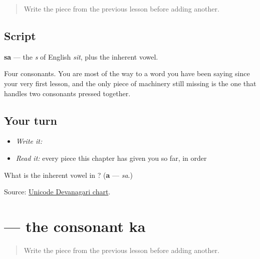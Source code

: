 \label{lesson:MR-W01-sa}



\begin{quote}
Write the piece from the previous lesson before adding another.
\end{quote}

\subsection*{Script}

\begin{quote}
\end{quote}

\textbf{sa} — the \emph{s} of English \emph{sit}, plus the inherent vowel.

Four consonants. You are most of the way to a word you have been saying since your very first lesson, and the only piece of machinery still missing is the one that handles two consonants pressed together.

\subsection*{Your turn}
\begin{itemize}
\raggedright
  \item \emph{Write it:} 
  \item \emph{Read it:} every piece this chapter has given you so far, in order
\end{itemize}

\begin{tcolorbox}[breakable,colback=teal!4,colframe=teal!35!black,title={Before you move on}]
What is the inherent vowel in \textbf{}? (\textbf{a} — \emph{sa}.)

Source: \href{https://www.unicode.org/charts/PDF/U0900.pdf}{Unicode Devanagari chart}.
\end{tcolorbox}
\section[\texorpdfstring{\mr{क} (ka)}{क (ka)}]{ — the consonant ka}

\label{lesson:MR-W01-ka}



\begin{quote}
Write the piece from the previous lesson before adding another.
\end{quote}

